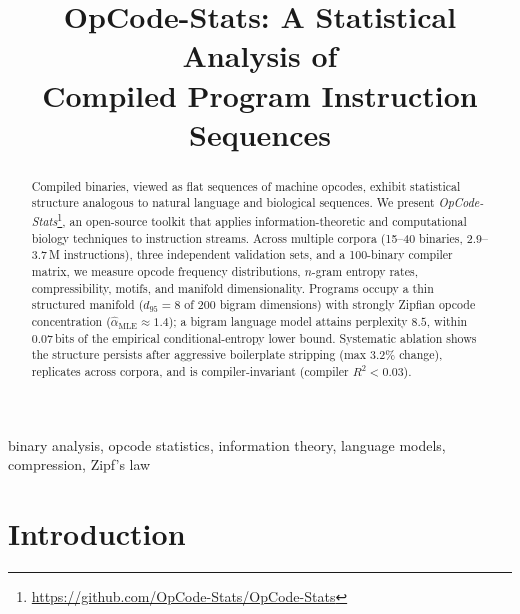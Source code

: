 \documentclass[conference]{IEEEtran}
\begin{document}
\title{OpCode-Stats: A Statistical Analysis of\\Compiled Program Instruction Sequences}

\author{%
  \and
}

\maketitle

\begin{abstract}
Compiled binaries, viewed as flat sequences of machine opcodes, exhibit
statistical structure analogous to natural language and biological sequences.
We present \emph{OpCode-Stats}\footnote{\url{https://github.com/OpCode-Stats/OpCode-Stats}},
an open-source toolkit that applies information-theoretic and computational
biology techniques to instruction streams.  Across multiple corpora
(15--40 binaries, 2.9--3.7\,M instructions), three independent validation
sets, and a 100-binary compiler matrix, we measure opcode frequency
distributions, $n$-gram entropy rates, compressibility, motifs, and
manifold dimensionality.  Programs occupy a thin structured manifold
($d_{95}{=}8$ of 200 bigram dimensions) with strongly Zipfian opcode
concentration ($\hat{\alpha}_{\mathrm{MLE}}{\approx}1.4$); a bigram language
model attains perplexity $8.5$, within $0.07$\,bits of the empirical
conditional-entropy lower bound.  Systematic ablation shows the structure
persists after aggressive boilerplate stripping (max $3.2\%$ change),
replicates across corpora, and is compiler-invariant
(compiler $R^2{<}0.03$).
\end{abstract}

\begin{IEEEkeywords}
binary analysis, opcode statistics, information theory, language models,
compression, Zipf's law
\end{IEEEkeywords}

\section{Introduction}
\label{sec:intro}
\end{document}
